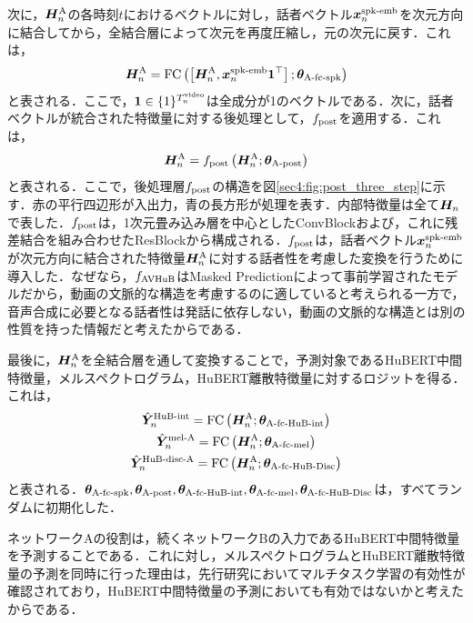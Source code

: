 次に，$\bm{H}^{\text{A}}_{n}$の各時刻$t$におけるベクトルに対し，話者ベクトル$\bm{x}^{\text{spk-emb}}_{n}$を次元方向に結合してから，全結合層によって次元を再度圧縮し，元の次元に戻す．これは，
\begin{equation}
    \bm{H}^{\text{A}}_{n} = \text{FC}\left(\left[\bm{H}^{\text{A}}_{n}, \bm{x}^{\text{spk-emb}}_{n} \bm{1}^{\top}\right]; \bm{\theta}_{\text{A-fc-spk}}\right)
\end{equation}
と表される．ここで，$\bm{1} \in \{1\}^{T^{\text{video}}_{n}}$は全成分が1のベクトルである．次に，話者ベクトルが統合された特徴量に対する後処理として，$f_{\text{post}}$を適用する．これは，
\begin{equation}
    \bm{H}^{\text{A}}_{n} = f_{\text{post}}\left(\bm{H}^{\text{A}}_{n}; \bm{\theta}_{\text{A-post}}\right)
\end{equation}
と表される．ここで，後処理層$f_{\text{post}}$の構造を図\ref{sec4:fig:post_three_step}に示す．赤の平行四辺形が入出力，青の長方形が処理を表す．内部特徴量は全て$\bm{H}_{n}$で表した．$f_{\text{post}}$は，1次元畳み込み層を中心としたConvBlockおよび，これに残差結合を組み合わせたResBlockから構成される．$f_{\text{post}}$は，話者ベクトル$\bm{x}^{\text{spk-emb}}_{n}$が次元方向に結合された特徴量$\bm{H}^{\text{A}}_{n}$に対する話者性を考慮した変換を行うために導入した．なぜなら，$f_{\text{AVHuB}}$はMasked Predictionによって事前学習されたモデルだから，動画の文脈的な構造を考慮するのに適していると考えられる一方で，音声合成に必要となる話者性は発話に依存しない，動画の文脈的な構造とは別の性質を持った情報だと考えたからである．

最後に，$\bm{H}^{\text{A}}_{n}$を全結合層を通して変換することで，予測対象であるHuBERT中間特徴量，メルスペクトログラム，HuBERT離散特徴量に対するロジットを得る．これは，
\begin{gather}
    \hat{\bm{Y}}^{\text{HuB-int}}_{n} = \text{FC}\left(\bm{H}^{\text{A}}_{n}; \bm{\theta}_{\text{A-fc-HuB-int}}\right) \\
    \hat{\bm{Y}}^{\text{mel-A}}_{n} = \text{FC}\left(\bm{H}^{\text{A}}_{n}; \bm{\theta}_{\text{A-fc-mel}}\right) \\
    \hat{\bm{Y}}^{\text{HuB-disc-A}}_{n} = \text{FC}\left(\bm{H}^{\text{A}}_{n}; \bm{\theta}_{\text{A-fc-HuB-Disc}}\right)
\end{gather}
と表される．$\bm{\theta}_{\text{A-fc-spk}}, \bm{\theta}_{\text{A-post}}, \bm{\theta}_{\text{A-fc-HuB-int}}, \bm{\theta}_{\text{A-fc-mel}}, \bm{\theta}_{\text{A-fc-HuB-Disc}}$は，すべてランダムに初期化した．

ネットワークAの役割は，続くネットワークBの入力であるHuBERT中間特徴量を予測することである．これに対し，メルスペクトログラムとHuBERT離散特徴量の予測を同時に行った理由は，先行研究においてマルチタスク学習の有効性が確認されており，HuBERT中間特徴量の予測においても有効ではないかと考えたからである．


